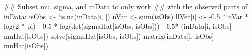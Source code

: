 \begin{Schunk}
\begin{Sinput}
 ## Subset mu, sigma, and inData to only work
 ## with the observed parts of inData:
 isObs <- !is.na(inData[i, ])
 nVar <- sum(isObs)
 llVec[i] <- -0.5 * nVar * log(2 * pi) -
     0.5 * log(det(sigmaHat[isObs, isObs])) -
         0.5* (inData[i, isObs] - muHat[isObs]) %*%
             solve(sigmaHat[isObs, isObs]) %*%
                 matrix(inData[i, isObs] - muHat[isObs])
\end{Sinput}
\end{Schunk}
